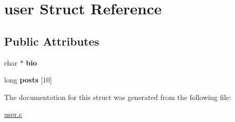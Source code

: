 \hypertarget{structuser}{}\section{user Struct Reference}
\label{structuser}
\subsection*{Public Attributes}
\begin{DoxyCompactItemize}
\item 
\mbox{\label{structuser_a836f0f349078239d6f9f6091c1c770fe}} 
char $\ast$ {\bfseries bio}
\item 
\mbox{\label{structuser_aacfeb3f2fa91d7d7ea0d72a1eb74e6f3}} 
long {\bfseries posts} \mbox{[}10\mbox{]}
\end{DoxyCompactItemize}


The documentation for this struct was generated from the following file\+:\begin{DoxyCompactItemize}
\item 
\hyperlink{user_8c}{user.\+c}\end{DoxyCompactItemize}
